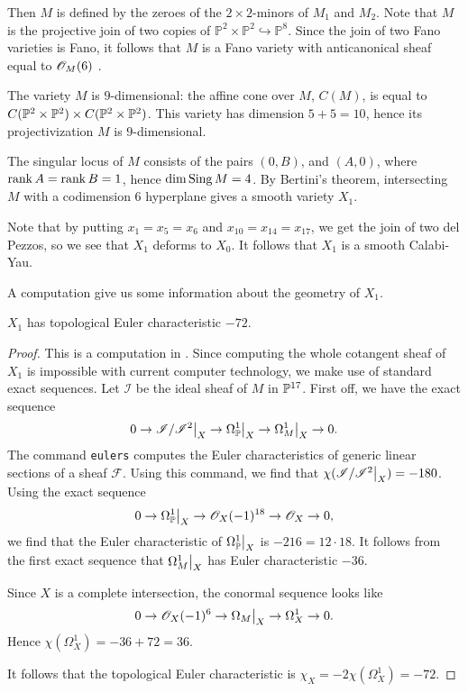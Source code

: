 Then $M$ is defined by the zeroes of the $2 \times 2$-minors of $M_1$ and $M_2$. Note that $M$ is the projective join of two copies of $\mathbb P^2 \times \mathbb P^2 \hookrightarrow \mathbb P^8$. Since the join of two Fano varieties is Fano, it follows that $M$ is a Fano variety with anticanonical sheaf equal to $\OO_{M}(6)$ .

The variety $M$ is $9$-dimensional: the affine cone over $M$, $C(M)$, is equal to $C(\mathbb P^2 \times \P^2) \times C(\mathbb P^2 \times \P^2)$. This variety has dimension $5+5=10$, hence its projectivization $M$ is $9$-dimensional. 

The singular locus of $M$ consists of the pairs $(0,B)$, and $(A,0)$, where $\rank A= \rank B = 1$, hence $\dim \sing M = 4$. By Bertini's theorem, intersecting $M$ with a codimension $6$ hyperplane gives a smooth variety $X_1$.

Note that by putting $x_1=x_5=x_6$ and $x_{10}=x_{14}=x_{17}$, we get the join of two del Pezzos, so we see that $X_1$ deforms to $X_0$. It follows that $X_1$ is a smooth Calabi-Yau.

A \MM computation give us some information about the geometry of $X_1$.
\begin{proposition}
\label{prop:x1euler} 
$X_1$ has topological Euler characteristic $-72$.
\end{proposition}
\begin{proof}
This is a computation in \MM. Since computing the whole cotangent sheaf of $X_1$ is impossible with current computer technology, we make use of standard exact sequences. Let $\mathscr I$ be the ideal sheaf of $M$ in $\P^{17}$. First off, we have the exact sequence
$$
0 \to \restr{\mathscr I/\mathscr I^2}{X} \to \restr{\Omega_\P^1}{X} \to \restr{\Omega_M^1}{X} \to 0.
$$
The \MM command \texttt{eulers} computes the Euler characteristics of generic linear sections of a sheaf $\mathscr F$. Using this command, we find that $\chi(\restr{\mathscr I/\mathscr I^2}{X})=-180$. Using the exact sequence
$$
0 \to \restr{\Omega_\P^1}{X} \to \OO_X(-1)^{18} \to \OO_X \to 0,
$$
we find that the Euler characteristic of $\restr{\Omega_\P^1}{X}$ is $-216=12\cdot 18$. It follows from the first exact sequence that $\restr{\Omega_M^1}{X}$ has Euler characteristic $-36$.

Since $X$ is a complete intersection, the conormal sequence looks like
$$
0 \to \OO_X(-1)^6 \to \restr{\Omega_M}{X}  \to \Omega_X^1 \to 0.
$$
Hence $\chi(\Omega_X^1) = -36+72 = 36$.

It follows that the topological Euler characteristic is $\chi_X = -2\chi(\Omega_X^1)=-72$.
\end{proof}

